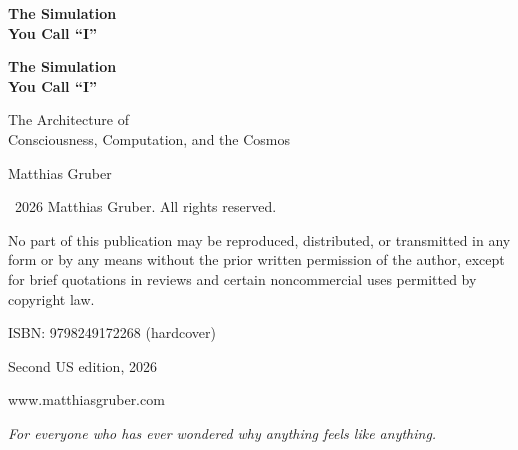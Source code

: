 \documentclass[11pt, twoside, openright]{book}
\makeatletter
\def\cleardoublepage{\clearpage\if@twoside \ifodd\c@page\else
  \thispagestyle{empty}\hbox{}\newpage
  \if@twocolumn\hbox{}\newpage\fi\fi\fi}
\makeatother
\begin{document}
\frontmatter
\pagestyle{empty}

\vspace*{3in}
\begin{center}
{\Huge\bfseries The Simulation\\[0.3cm] You Call ``I''\par}
\end{center}
\cleardoublepage

\vspace*{2in}
\begin{center}
{\Huge\bfseries The Simulation\\[0.3cm] You Call ``I''\par}
\vspace{0.8cm}
{\Large The Architecture of\\[0.2cm] Consciousness, Computation, and the Cosmos\par}
\vspace{2cm}
{\large Matthias Gruber\par}
\end{center}
\clearpage

\thispagestyle{empty}
\vspace*{\fill}
{\small
\noindent \textcopyright\ 2026 Matthias Gruber. All rights reserved.\par
\vspace{0.5cm}
\noindent No part of this publication may be reproduced, distributed, or transmitted
in any form or by any means without the prior written permission of the author,
except for brief quotations in reviews and certain noncommercial uses
permitted by copyright law.\par
\vspace{0.5cm}
\noindent ISBN: 9798249172268 (hardcover)\par
\vspace{0.5cm}
\noindent Second US edition, 2026\par
\vspace{0.5cm}
\noindent www.matthiasgruber.com\par
}
\cleardoublepage

\thispagestyle{empty}
\vspace*{3in}
\begin{center}
\textit{For everyone who has ever wondered why anything feels like anything.}
\end{center}
\cleardoublepage
\end{document}
